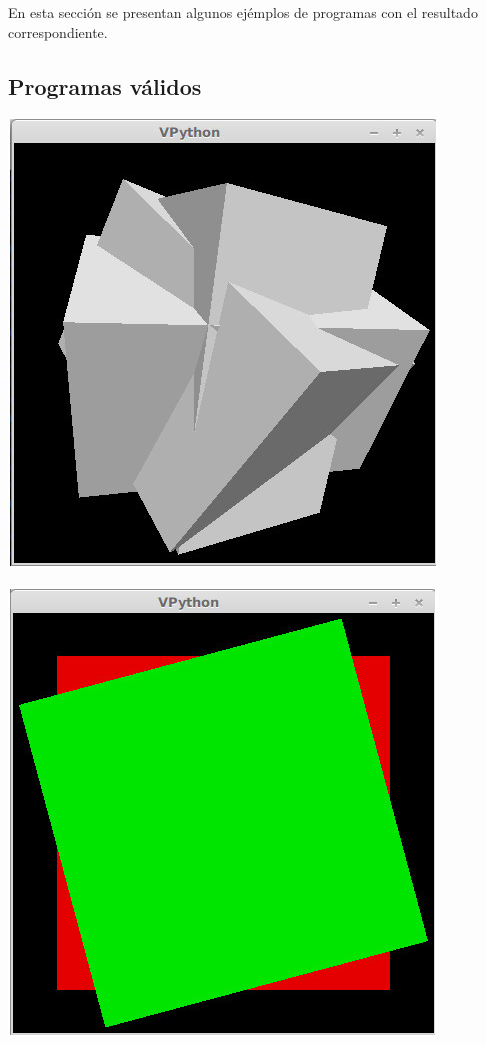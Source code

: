 En esta secci\'on se presentan algunos ej\'emplos de programas con el resultado correspondiente.

\subsection{Programas v\'alidos}



\centerline{\includegraphics[scale=0.40]{../imagenes/eg04.jpg}}





\centerline{\includegraphics[scale=0.40]{../imagenes/eg11.jpg}}





